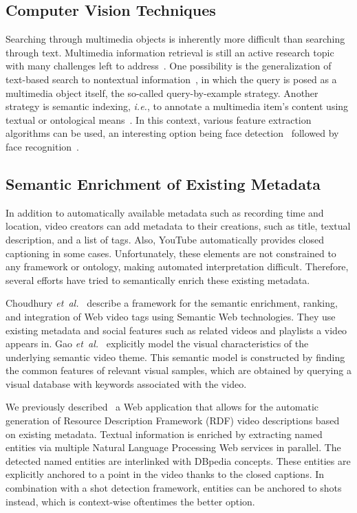 \documentclass[runningheads,a4paper]{llncs}
\begin{document}
\subsection{Computer Vision Techniques}
Searching through multimedia objects is inherently more difficult than searching through text.
Multimedia information retrieval is still an active research topic with many challenges left to address~\cite{Hanjalic:2008}.
One possibility is the generalization of text-based search to nontextual information~\cite{Sivic:2008}, in which the query is posed as a multimedia object itself, the so-called query-by-example strategy.
Another strategy is semantic indexing, \emph{i.e.}, to annotate a multimedia item's content using textual or ontological means~\cite{Hauptmann:2008}.
In this context, various feature extraction algorithms can be used, an interesting option being face detection~\cite{ViolaJones} followed by face recognition~\cite{Verstockt:2009}.

\subsection{Semantic Enrichment of Existing Metadata}
In addition to automatically available metadata such as recording time and location, video creators can add metadata to their creations, such as title, textual description, and a list of tags. Also, YouTube automatically provides closed captioning in some cases. Unfortunately, these elements are not constrained to any framework or ontology, making automated interpretation difficult. Therefore, several efforts have tried to semantically enrich these existing metadata.

Choudhury \emph{et~al.}~\cite{Choudhury:YouTube} describe a framework for the semantic enrichment, ranking, and integration of Web video tags using Semantic Web technologies. They use existing metadata and social features such as related videos and playlists a video appears in.
Gao \emph{et~al.}~\cite{Gao:2009} explicitly model the visual characteristics of the underlying semantic video theme. This semantic model is constructed by finding the common features of relevant visual samples, which are obtained by querying a visual database with keywords associated with the video.

We previously described~\cite{semwebvid} a Web application that allows for the automatic generation of Resource Description Framework (RDF) video descriptions based on existing metadata. Textual information is enriched by extracting named entities via multiple Natural Language Processing Web services in parallel. The detected named entities are interlinked with DBpedia concepts. These entities are explicitly anchored to a point in the video thanks to the closed captions. In combination with a shot detection framework, entities can be anchored to shots instead, which is context-wise oftentimes the better option.
\end{document}
